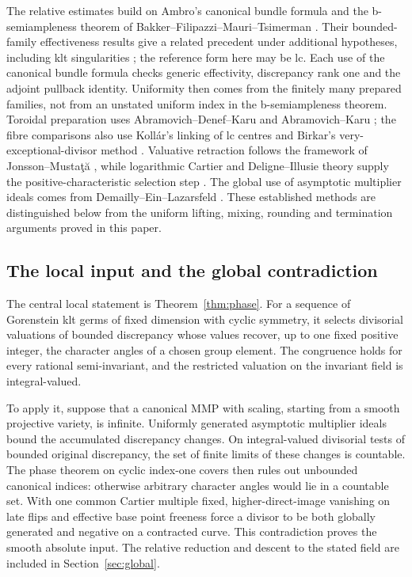 The relative estimates build on Ambro's canonical bundle formula
\cite{AmbroCBF} and the b-semiampleness theorem of
Bakker--Filipazzi--Mauri--Tsimerman \cite{BFMT}. Their bounded-family
effectiveness results give a related precedent under additional
hypotheses, including klt singularities
\cite[Corollaries~7.8--7.9]{BFMT}; the reference form here may be lc.
Each use of the canonical bundle formula checks generic effectivity,
discrepancy rank one and the adjoint pullback identity.
Uniformity then comes from the finitely many prepared families, not
from an unstated uniform index in the b-semiampleness theorem.
Toroidal preparation
uses Abramovich--Denef--Karu and Abramovich--Karu
\cite{ADK,AbramovichKaruRefinement}; the fibre comparisons also use
Koll\'ar's linking of lc centres \cite{KollarSources} and Birkar's
very-exceptional-divisor method \cite{BirkarFlips}. Valuative
retraction follows the framework of Jonsson--Musta\c t\u a
\cite{JonssonMustata}, while logarithmic Cartier and
Deligne--Illusie theory supply the positive-characteristic selection
step \cite{Cartier1957,Katz1970,DeligneIllusie}. The global use of
asymptotic multiplier ideals comes from Demailly--Ein--Lazarsfeld
\cite{DEL}. These established methods are distinguished below from
the uniform lifting, mixing, rounding and termination arguments
proved in this paper.

\subsection{The local input and the global contradiction}

The central local statement is Theorem~\ref{thm:phase}. For a sequence of
Gorenstein klt germs of fixed dimension with cyclic symmetry, it selects
divisorial valuations of bounded discrepancy whose values recover, up
to one fixed positive integer, the character angles of a chosen group
element. The congruence holds for every rational semi-invariant, and
the restricted valuation on the invariant field is integral-valued.

To apply it, suppose that a canonical MMP with scaling, starting from a
smooth projective variety, is infinite. Uniformly generated asymptotic
multiplier ideals bound the accumulated discrepancy changes. On
integral-valued divisorial tests of bounded original discrepancy, the
set of finite limits of these changes is countable. The phase theorem
on cyclic index-one covers then rules out unbounded canonical indices:
otherwise arbitrary character angles would lie in a countable set.
With one common Cartier multiple fixed, higher-direct-image vanishing
on late flips and effective base point freeness force a divisor to be
both globally generated and negative on a contracted curve. This
contradiction proves the smooth absolute input. The relative reduction
and descent to the stated field are included in
Section~\ref{sec:global}.

